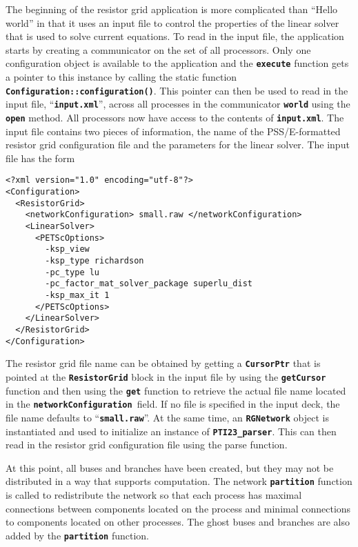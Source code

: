The beginning of the resistor grid application is more complicated than ``Hello
world'' in that it uses an input file to control the properties of the linear
solver that is used to solve current equations. To read in the input file, the
application starts by creating a communicator on the set of all processors. Only
one configuration object is available to the application and the
\texttt{\textbf{execute}} function gets a pointer to this instance by calling
the static function \texttt{\textbf{Configuration::configuration()}}. This
pointer can then be used to read in the input file,
``\texttt{\textbf{input.xml}}'', across all processes in the communicator
\texttt{\textbf{world}} using the \texttt{\textbf{open}} method. All processors
now have access to the contents of \texttt{\textbf{input.xml}}. The input file
contains two pieces of information, the name of the PSS/E-formatted resistor grid configuration file and the parameters for the linear solver. The input file has the form

{
\color{blue}
\begin{Verbatim}[fontseries=b]
<?xml version="1.0" encoding="utf-8"?>
<Configuration>
  <ResistorGrid>
    <networkConfiguration> small.raw </networkConfiguration>
    <LinearSolver>
      <PETScOptions>
        -ksp_view
        -ksp_type richardson
        -pc_type lu
        -pc_factor_mat_solver_package superlu_dist
        -ksp_max_it 1
      </PETScOptions>
    </LinearSolver>
  </ResistorGrid>
</Configuration>
\end{Verbatim}
}

The resistor grid file name can be obtained by getting a
\texttt{\textbf{CursorPtr}} that is pointed at the
\texttt{\textbf{ResistorGrid}} block in the input file by using the
\texttt{\textbf{getCursor}} function and then using the \texttt{\textbf{get}}
function to retrieve the actual file name located in the
\texttt{\textbf{networkConfiguration }}field. If no file is specified in the
input deck, the file name defaults to ``\texttt{\textbf{small.raw}}''. At the
same time, an \texttt{\textbf{RGNetwork}} object is instantiated and used to
initialize an instance of \texttt{\textbf{PTI23\_parser}}. This can then read in the resistor grid configuration file using the parse function.

At this point, all buses and branches have been created, but they may not be distributed in a way that supports computation. The network \texttt{\textbf{partition}} function is called to redistribute the network so that each process has maximal connections between components located on the process and minimal connections to components located on other processes. The ghost buses and branches are also added by the \texttt{\textbf{partition}} function.

